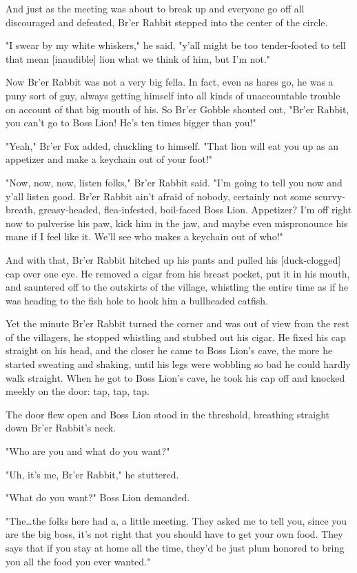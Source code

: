 And just as the meeting was about to break up and everyone go off all discouraged and defeated, Br'er Rabbit stepped into the center of the circle.

"I swear by my white whiskers," he said, "y'all might be too tender-footed to tell that mean [inaudible] lion what we think of him, but I'm not."

Now Br'er Rabbit was not a very big fella. In fact, even as hares go, he was a puny sort of guy, always getting himself into all kinds of unaccountable trouble on account of that big mouth of his. So Br'er Gobble shouted out, "Br'er Rabbit, you can't go to Boss Lion! He's ten times bigger than you!"

"Yeah," Br'er Fox added, chuckling to himself. "That lion will eat you up as an appetizer and make a keychain out of your foot!"

"Now, now, now, listen folks," Br'er Rabbit said. "I'm going to tell you now and y'all listen good. Br'er Rabbit ain't afraid of nobody, certainly not some scurvy-breath, greasy-headed, flea-infested, boil-faced Boss Lion. Appetizer? I'm off right now to pulverise his paw, kick him in the jaw, and maybe even mispronounce his mane if I feel like it. We'll see who makes a keychain out of who!"

And with that, Br'er Rabbit hitched up his pants and pulled his [duck-clogged] cap over one eye. He removed a cigar from his breast pocket, put it in his mouth, and sauntered off to the outskirts of the village, whistling the entire time as if he was heading to the fish hole to hook him a bullheaded catfish.

Yet the minute Br'er Rabbit turned the corner and was out of view from the rest of the villagers, he stopped whistling and stubbed out his cigar. He fixed his cap straight on his head, and the closer he came to Boss Lion's cave, the more he started sweating and shaking, until his legs were wobbling so bad he could hardly walk straight. When he got to Boss Lion's cave, he took his cap off and knocked meekly on the door: tap, tap, tap.

The door flew open and Boss Lion stood in the threshold, breathing straight down Br'er Rabbit's neck.

"Who are you and what do you want?"

"Uh, it's me, Br'er Rabbit," he stuttered.

"What do you want?" Boss Lion demanded.

"The\dots the folks here had a, a little meeting. They asked me to tell you, since you are the big boss, it's not right that you should have to get your own food. They says that if you stay at home all the time, they'd be just plum honored to bring you all the food you ever wanted."

